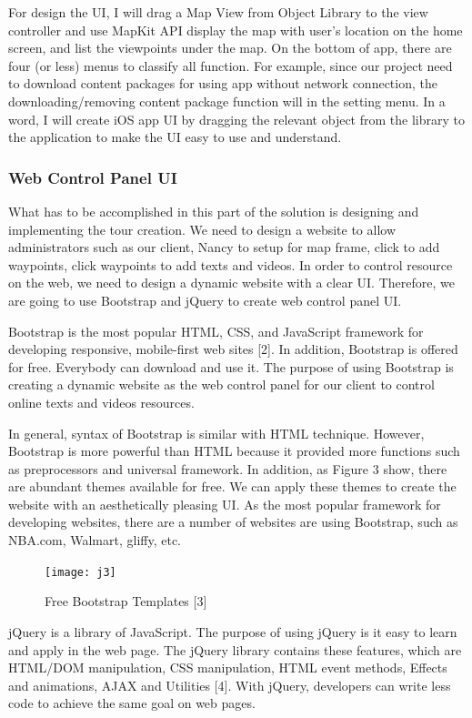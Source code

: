 \documentclass[letterpaper, 10pt,titlepage]{article}
\begin{document}
For design the UI, I will drag a Map View from Object Library to the view controller and use MapKit API display the map with user’s location on the home screen, and list the viewpoints under the map. On the bottom of app, there are four (or less) menus to classify all function. For example, since our project need to download content packages for using app without network connection, the downloading/removing content package function will in the setting menu. In a word, I will create iOS app UI by dragging the relevant object from the library to the application to make the UI easy to use and understand.


\subsubsection{Web Control Panel UI}
What has to be accomplished in this part of the solution is designing and implementing the tour creation. We need to design a website to allow administrators such as our client, Nancy to setup for map frame, click to add waypoints, click waypoints to add texts and videos. In order to control resource on the web, we need to design a dynamic website with a clear UI. Therefore, we are going to use Bootstrap and jQuery to create web control panel UI. 


Bootstrap is the most popular HTML, CSS, and JavaScript framework for developing responsive, mobile-first web sites [2]. In addition, Bootstrap is offered for free. Everybody can download and use it. The purpose of using Bootstrap is creating a dynamic website as the web control panel for our client to control online texts and videos resources. 


In general, syntax of Bootstrap is similar with HTML technique. However, Bootstrap is more powerful than HTML because it provided more functions such as preprocessors and universal framework. In addition, as Figure 3 show, there are abundant themes available for free. We can apply these themes to create the website with an aesthetically pleasing UI. As the most popular framework for developing websites, there are a number of websites are using Bootstrap, such as NBA.com, Walmart, gliffy, etc.

\begin{figure}[ht]
    \centering
    \texttt{[image: j3]}
    \caption{Free Bootstrap Templates [3]}
    \label{jiawei3}
\end{figure}

jQuery is a library of JavaScript. The purpose of using jQuery is it easy to learn and apply in the web page. The jQuery library contains these features, which are HTML/DOM manipulation, CSS manipulation, HTML event methods, Effects and animations, AJAX and Utilities [4]. With jQuery, developers can write less code to achieve the same goal on web pages. 
\end{document}
